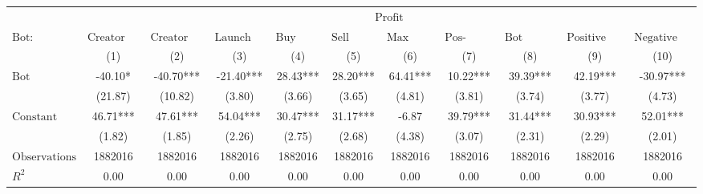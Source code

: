 \begin{tabular}{lcccccccccc}
\hline
 & \multicolumn{10}{c}{$\text{Profit}$} \\
 $\text{Bot}:$ & $\text{Creator Launch Bundle}$ & $\text{Creator Buy Bundle}$ & $\text{Launch Bundle}$ & $\text{Buy Bundle}$ & $\text{Sell Bundle}$ & $\text{Max Same Txn}$ & $\text{Pos-\#Swaps Ratio}$ & $\text{Bot Comment}$ & $\text{Positive Comment Bot}$ & $\text{Negative Comment Bot}$ \\
 & (1) & (2) & (3) & (4) & (5) & (6) & (7) & (8) & (9) & (10)\\
\hline
$\text{Bot}$ & -40.10* & -40.70*** & -21.40*** & 28.43*** & 28.20*** & 64.41*** & 10.22*** & 39.39*** & 42.19*** & -30.97*** \\
 & (21.87) & (10.82) & (3.80) & (3.66) & (3.65) & (4.81) & (3.81) & (3.74) & (3.77) & (4.73) \\
$\text{Constant}$ & 46.71*** & 47.61*** & 54.04*** & 30.47*** & 31.17*** & -6.87 & 39.79*** & 31.44*** & 30.93*** & 52.01*** \\
 & (1.82) & (1.85) & (2.26) & (2.75) & (2.68) & (4.38) & (3.07) & (2.31) & (2.29) & (2.01) \\
$\text{Observations}$ & 1882016 & 1882016 & 1882016 & 1882016 & 1882016 & 1882016 & 1882016 & 1882016 & 1882016 & 1882016 \\
$R^2$ & 0.00 & 0.00 & 0.00 & 0.00 & 0.00 & 0.00 & 0.00 & 0.00 & 0.00 & 0.00 \\
\hline
\end{tabular}
